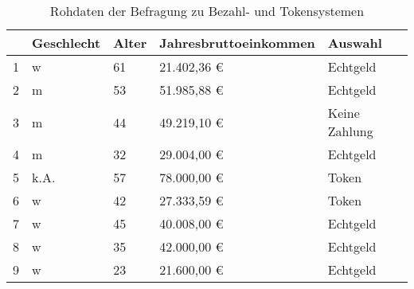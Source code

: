 \begin{table}[H]
\centering
	\caption[Rohdaten der Befragung]{Rohdaten der Befragung zu Bezahl- und Tokensystemen}
\begin{tabular}{lllll}
\rowcolor{red!25}
\hline
\multicolumn{1}{|l|}{\textbf{Nr.}} & \multicolumn{1}{l|}{\textbf{Geschlecht}} & \multicolumn{1}{l|}{\textbf{Alter}} & \multicolumn{1}{l|}{\textbf{Jahresbruttoeinkommen}} & \multicolumn{1}{l|}{\textbf{Auswahl}} \\ \hline
1                                  & w                                        & 61                                  & 21.402,36 €                             & Echtgeld                              \\
2                                  & m                                        & 53                                  & 51.985,88 €                             & Echtgeld                              \\
3                                  & m                                        & 44                                  & 49.219,10 €                             & Keine Zahlung                         \\
4                                  & m                                        & 32                                  & 29.004,00 €                             & Echtgeld                              \\
5                                  & k.A.                                     & 57                                  & 78.000,00 €                             & Token                                 \\
6                                  & w                                        & 42                                  & 27.333,59 €                             & Token                                 \\
7                                  & w                                        & 45                                  & 40.008,00 €                             & Echtgeld                              \\
8                                  & w                                        & 35                                  & 42.000,00 €                             & Echtgeld                              \\
9                                  & w                                        & 23                                  & 21.600,00 €                             & Echtgeld                              \\

\end{tabular}
\end{table}

